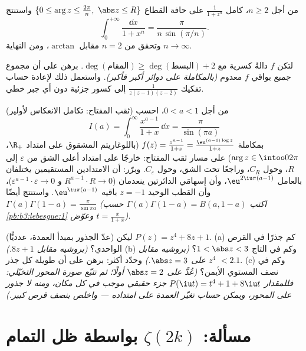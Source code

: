 \begin{exercise}[$\star\star\star$]\label{exo:b3:residues:9}
من أجل $n \geq 2$، كامل $\frac1{1 + z^n}$ على حافة القطاع $\{0 \leq \arg z \leq \frac{2\pi}n,\ \abs z
\leq R\}$
واستنتج
\[
\int_0^{+\infty}\frac{\dd x}{1 + x^n} =
\frac{\pi}{n\,\sin(\pi/n)} .
\]
وتحقق من $n = 2$ مقابل $\arctan$، ومن النهاية $n \to
\infty$.
\end{exercise}

\begin{exercise}[$\star\star$]\label{exo:b3:residues:10}
لتكن $f$ دالةً كسرية مع $\deg(\text{المقام})
\geq \deg(\text{البسط}) + 2$. برهن على أن مجموع
\emph{جميع} بواقي $f$ معدوم \emph{(بالمكاملة على دوائر أكبر
فأكبر)}. واستعمل ذلك لإعادة حساب تفكيك $\frac1{z(z-1)(z-2)}$ إلى كسور جزئية
دون أي جبر خطي.
\end{exercise}

\begin{exercise}[$\star\star\star$]\label{exo:b3:residues:11}
(ثقب المفتاح: تكامل الانعكاس لأولير) من أجل $0 < a < 1$، احسب
\[
I(a) = \int_0^{\infty}\frac{x^{a-1}}{1 + x}\,\dd x =
\frac{\pi}{\sin(\pi a)}
\]
بمكاملة $f(z) = \frac{z^{a-1}}{1+z} =
\frac{\eu^{(a-1)\log z}}{1 + z}$ (باللوغاريتم المشقوق على امتداد $\R_+$،
$\arg z \in \intoo0{2\pi}$) على مسار ثقب المفتاح: خارجًا على امتداد أعلى الشق من
$\varepsilon$ إلى $R$، وحول $C_R$، وراجعًا تحت الشق، وحول
$C_\varepsilon$. وبرّر: أن الامتدادين المستقيمين يختلفان
بالعامل $\eu^{2\iu\pi(a-1)}$، وأن إسهامَي الدائرتين ينعدمان ($R^{a-1}\cdot R \to 0$
و $\varepsilon^{a-1}\cdot\varepsilon \to 0$)، وأن القطب الوحيد $z = -1$ باقيه $\eu^{\iu\pi(a - 1)}$. واستنتج
أيضًا $\Gamma(a)\Gamma(1 - a) = \frac\pi{\sin\pi a}$ \emph{(اكتب $\Gamma(a)\Gamma(1-a) = B(a, 1-a)$ حسب \cref{pb:b3:lebesgue:1} وعوّض $t =
\frac{x}{1+x}$)}.
\end{exercise}

\begin{exercise}[$\star\star$]\label{exo:b3:residues:12}
(عدّ الجذور بمبدأ العمدة، عدديًّا) ليكن $P(z) = z^4 + 8z + 1$.
(a) كم جذرًا في القرص الواحدي؟ \emph{(بروشيه مقابل $8z + 1$.)}
(b) وكم في التاج $1 < \abs z < 3$؟ \emph{(بروشيه مقابل $z^4$
على $\abs z = 3$.)} وحدّد أكثر: برهن على أن طويلة كل جذر
$< 2.1$.
(c) وكم في نصف المستوي الأيمن؟ \emph{(عُدَّ على $\abs z = 2$
أولًا؛ ثم تتبّع صورة المحور التخيّلي: فللمقدار $P(\iu t) = t^4 + 1 + 8\iu t$ جزء
حقيقي موجب في كل مكان، ومنه لا جذور على المحور، ويمكن حساب
تغيّر العمدة على امتداده --- واخلص بنصف قرص كبير.)}
\end{exercise}

\section{مسألة: \texorpdfstring{$\zeta(2k)$}{زيتا(2k)} بواسطة
ظل التمام}

